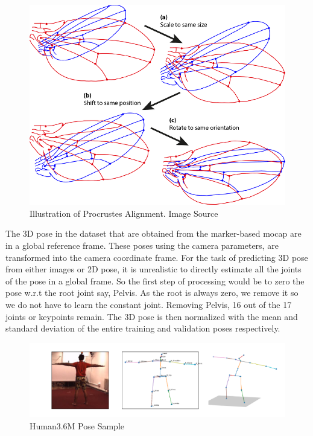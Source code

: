 \begin{figure}[!h]
    \centering
    \includegraphics[scale=0.8]{figures/Procrustes_superimposition.png}
    \caption{Illustration of Procrustes Alignment. Image Source \cite{Procrustes}}
    \label{fig:procrustes}
\end{figure}


The 3D pose in the dataset that are obtained from the marker-based \ac{mocap} are in a global reference frame. These poses using the camera parameters, are transformed into the camera coordinate frame. For the task of predicting 3D pose from either images or 2D pose, it is unrealistic to directly estimate all the joints of the pose in a global frame. So the first step of processing would be to zero the pose w.r.t the root joint say, Pelvis. As the root is always zero, we remove it so we do not have to learn the constant joint. Removing Pelvis, 16 out of the 17 joints or keypoints remain. The 3D pose is then normalized with the mean and standard deviation of the entire training and validation poses respectively.

\begin{figure}[h]
    \centering
    \includegraphics[width=\textwidth]{figures/h36poses.png}
    \caption{Human3.6M Pose Sample}
    \label{fig:h36_poses}
\end{figure}

